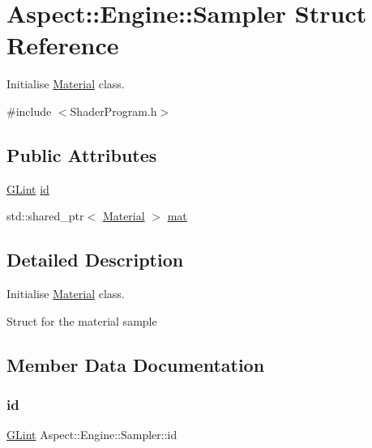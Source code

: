 \hypertarget{struct_aspect_1_1_engine_1_1_sampler}{}\section{Aspect\+:\+:Engine\+:\+:Sampler Struct Reference}
\label{struct_aspect_1_1_engine_1_1_sampler}


Initialise \mbox{\hyperlink{class_aspect_1_1_engine_1_1_material}{Material}} class.  




{\ttfamily \#include $<$Shader\+Program.\+h$>$}

\subsection*{Public Attributes}
\begin{DoxyCompactItemize}
\item 
\mbox{\hyperlink{glew_8h_acebcc1c5663f14ebde1d16831e5fed94}{G\+Lint}} \mbox{\hyperlink{struct_aspect_1_1_engine_1_1_sampler_a8b331dd0334126edee31cfa525101b66}{id}}
\item 
std\+::shared\+\_\+ptr$<$ \mbox{\hyperlink{class_aspect_1_1_engine_1_1_material}{Material}} $>$ \mbox{\hyperlink{struct_aspect_1_1_engine_1_1_sampler_acab2c584b4973154fe061a8398867de4}{mat}}
\end{DoxyCompactItemize}


\subsection{Detailed Description}
Initialise \mbox{\hyperlink{class_aspect_1_1_engine_1_1_material}{Material}} class. 

Struct for the material sample 

\subsection{Member Data Documentation}
\mbox{\label{struct_aspect_1_1_engine_1_1_sampler_a8b331dd0334126edee31cfa525101b66}} 
\subsubsection{\texorpdfstring{id}{id}}
{\footnotesize\ttfamily \mbox{\hyperlink{glew_8h_acebcc1c5663f14ebde1d16831e5fed94}{G\+Lint}} Aspect\+::\+Engine\+::\+Sampler\+::id}

